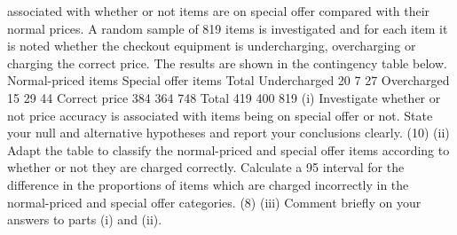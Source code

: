 associated with whether or not items are on special offer compared with their normal
prices. A random sample of 819 items is investigated and for each item it is noted
whether the checkout equipment is undercharging, overcharging or charging the
correct price. The results are shown in the contingency table below.
Normal-priced items Special offer items Total
Undercharged 20 7 27
Overcharged 15 29 44
Correct price 384 364 748
Total 419 400 819
(i) Investigate whether or not price accuracy is associated with items being on
special offer or not. State your null and alternative hypotheses and report your
conclusions clearly.
(10)
(ii) Adapt the table to classify the normal-priced and special offer items according
to whether or not they are charged correctly. Calculate a 95%
interval for the difference in the proportions of items which are charged
incorrectly in the normal-priced and special offer categories.
(8)
(iii) Comment briefly on your answers to parts (i) and (ii).

